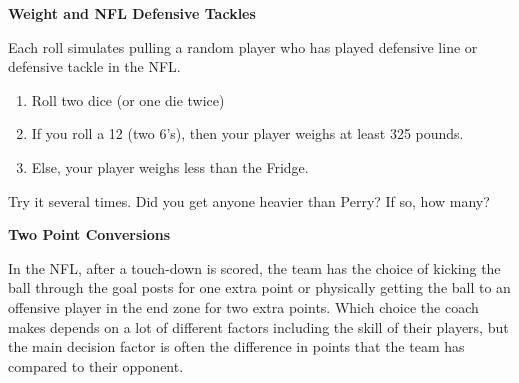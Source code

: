 
\textbf{Weight and NFL Defensive Tackles}

Each roll simulates pulling a random player who has played defensive line or defensive tackle in the NFL.
\begin{enumerate}
	\item Roll two dice (or one die twice)
	\item If you roll a 12 (two 6's), then your player weighs at least 325 pounds.
	\item Else, your player weighs less than the Fridge.
\end{enumerate}

Try it several times. Did you get anyone heavier than Perry? If so, how many?\vfill

\textbf{Two Point Conversions}

In the NFL, after a touch-down is scored, the team has the choice of kicking the ball through the goal posts for one extra point or physically getting the ball to an offensive player in the end zone for two extra points. Which choice the coach makes depends on a lot of different factors including the skill of their players, but the main decision factor is often the difference in points that the team has compared to their opponent.


